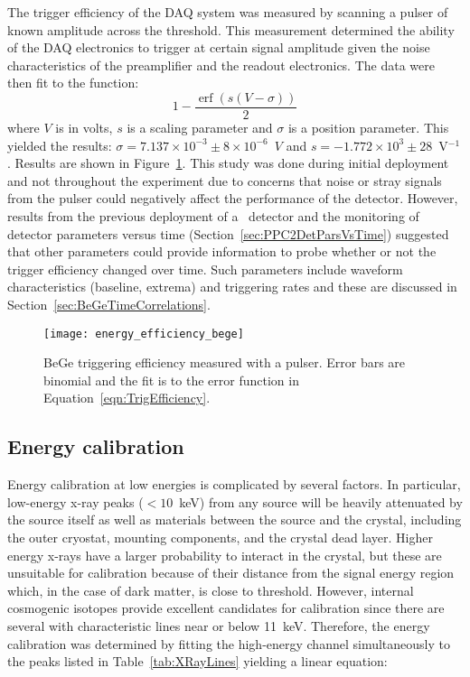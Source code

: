 The trigger efficiency of the DAQ system was measured by scanning a pulser of known amplitude across the threshold.  %
This measurement determined the ability of the DAQ electronics to trigger at certain signal amplitude given the noise characteristics of the preamplifier and the readout electronics.  The data were then fit to the function:
			\begin{equation}
				1 - \frac{\operatorname{erf} \left(s(V-\sigma)\right)}{2}
				\label{eqn:TrigEfficiency}
			\end{equation}
where $V$ is in volts, $s$ is a scaling parameter and $\sigma$ is a position parameter.  This yielded the results: $\sigma = 7.137\times10^{-3}\pm8\times10^{-6}$~$V$ and $s = -1.772\times10^{3}\pm28$~V$^{-1}$.  Results are shown in Figure~\ref{fig:BeGeTriggeringEfficiency}.  This study was done during initial deployment and not throughout the experiment due to concerns that noise or stray signals from the pulser could negatively affect the performance of the detector.  However, results from the previous deployment of a \ppc~detector and the monitoring of detector parameters versus time (Section~\ref{sec:PPC2DetParsVsTime}) suggested that other parameters could provide information to probe whether or not the trigger efficiency changed over time.  Such parameters include waveform characteristics (baseline, extrema) and triggering rates and these are discussed in Section~\ref{sec:BeGeTimeCorrelations}.

			\begin{figure}
				\centering
				\texttt{[image: energy\_efficiency\_bege]}
				\caption[BeGe triggering efficiency measured with a pulser]
				{BeGe triggering efficiency measured with a pulser.  Error bars are binomial and the fit is to the error function in
				Equation~\ref{eqn:TrigEfficiency}.}
				\label{fig:BeGeTriggeringEfficiency}
			\end{figure}

		\subsection{Energy calibration}

Energy calibration at low energies is complicated by several factors.  In particular, low-energy x-ray peaks ($<10$~keV) from any source will be heavily attenuated by the source itself as well as materials between the source and the crystal, including the outer cryostat, mounting components, and the crystal dead layer.  Higher energy x-rays have a larger probability to interact in the crystal, but these are unsuitable for calibration because of their distance from the signal energy region which, in the case of dark matter, is close to threshold.  However, internal cosmogenic isotopes provide excellent candidates for calibration since there are several with characteristic lines near or below 11~keV.  Therefore, the energy calibration was determined by fitting the high-energy channel simultaneously to the peaks listed in Table~\ref{tab:XRayLines} yielding a linear equation:


